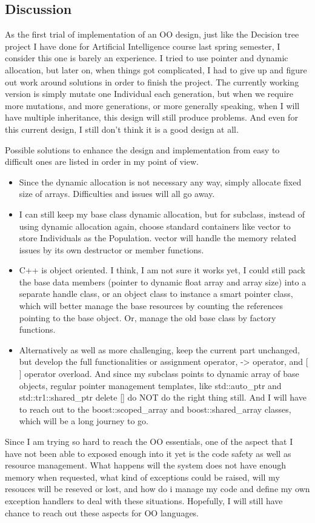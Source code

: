 \documentclass{article}
\begin{document}
\begin{CJK}{UTF8}{gbsn}
\section{Discussion}
As the first trial of implementation of an OO design, just like the Decision tree project I have done for Artificial Intelligence course last spring semester, I consider this one is barely an experience. I tried to use pointer and dynamic allocation, but later on, when things got complicated, I had to give up and figure out work around solutions in order to finish the project. The currently working version is simply mutate one Individual each generation, but when we require more mutations, and more generations, or more generally speaking, when I will have multiple inheritance, this design will still produce problems. And even for this current design, I still don't think it is a good design at all. 

Possible solutions to enhance the design and implementation from easy to difficult ones are listed in order in my point of view. 
\begin{itemize}
\itemsep=-3pt
\item Since the dynamic allocation is not necessary any way, simply allocate fixed size of arrays. Difficulties and issues will all go away. 
\item I can still keep my base class dynamic allocation, but for subclass, instead of using dynamic allocation again, choose standard containers like vector to store Individuals as the Population. vector will handle the memory related issues by its own destructor or member functions. 
\item C++ is object oriented. I think, I am not sure it works yet, I could still pack the base data members (pointer to dynamic float array and array size) into a separate handle class, or an object class to instance a smart pointer class, which will better manage the base resources by counting the references pointing to the base object. Or, manage the old base class by factory functions.  
\item Alternatively as well as more challenging, keep the current part unchanged, but develop the full functionalities or assignment operator, -> operator, and [ ] operator overload. And since my subclass points to dynamic array of base objects, regular pointer management templates, like std::auto\_ptr and std::tr1::shared\_ptr delete [] do NOT do the right thing still. And I will have to reach out to the boost::scoped\_array and boost::shared\_array classes, which will be a long journey to go. 
\end{itemize}

Since I am trying so hard to reach the OO essentials, one of the aspect that I have not been able to exposed enough into it yet is the code safety as well as resource management. What happens will the system does not have enough memory when requested, what kind of exceptions could be raised, will my resouces will be reseved or lost, and how do i manage my code and define my own exception handlers to deal with these situations. Hopefully, I will still have chance to reach out these aspects for OO languages.  

\end{CJK}
\end{document}
